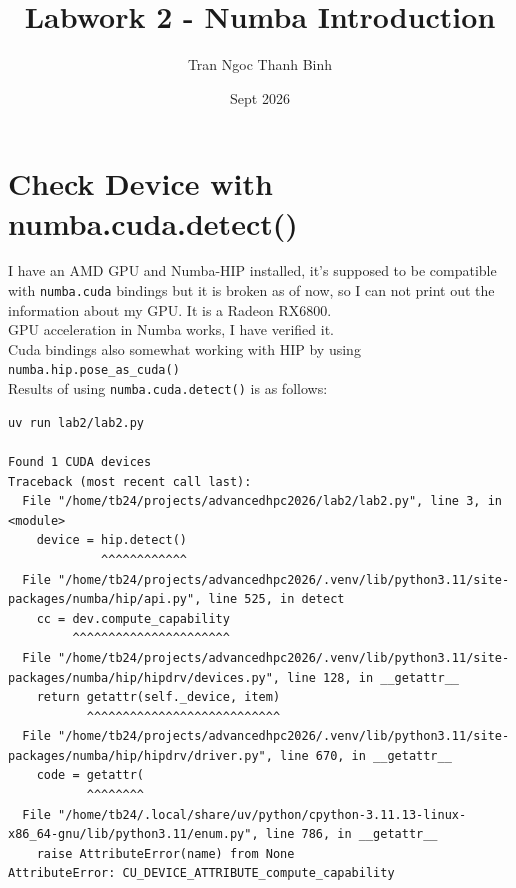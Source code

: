 \documentclass{article}
\title{Labwork 2 - Numba Introduction}
\author{Tran Ngoc Thanh Binh}
\date{Sept 2026}
\begin{document}
\maketitle

\section{Check Device with numba.cuda.detect()}

I have an AMD GPU and Numba-HIP installed, it's supposed to be compatible with \texttt{numba.cuda} bindings but 
it is broken as of now, so I can not print out the information about my GPU. It is a Radeon RX6800. \\

\noindent GPU acceleration in Numba works, I have verified it. \\
Cuda bindings also somewhat working with HIP by using \texttt{numba.hip.pose\_as\_cuda()} \\

\noindent Results of using \texttt{numba.cuda.detect()} is as follows: 

\begin{verbatim}
uv run lab2/lab2.py           

Found 1 CUDA devices
Traceback (most recent call last):
  File "/home/tb24/projects/advancedhpc2026/lab2/lab2.py", line 3, in <module>
    device = hip.detect()
             ^^^^^^^^^^^^
  File "/home/tb24/projects/advancedhpc2026/.venv/lib/python3.11/site-packages/numba/hip/api.py", line 525, in detect
    cc = dev.compute_capability
         ^^^^^^^^^^^^^^^^^^^^^^
  File "/home/tb24/projects/advancedhpc2026/.venv/lib/python3.11/site-packages/numba/hip/hipdrv/devices.py", line 128, in __getattr__
    return getattr(self._device, item)
           ^^^^^^^^^^^^^^^^^^^^^^^^^^^
  File "/home/tb24/projects/advancedhpc2026/.venv/lib/python3.11/site-packages/numba/hip/hipdrv/driver.py", line 670, in __getattr__
    code = getattr(
           ^^^^^^^^
  File "/home/tb24/.local/share/uv/python/cpython-3.11.13-linux-x86_64-gnu/lib/python3.11/enum.py", line 786, in __getattr__
    raise AttributeError(name) from None
AttributeError: CU_DEVICE_ATTRIBUTE_compute_capability
\end{verbatim}
\end{document}
